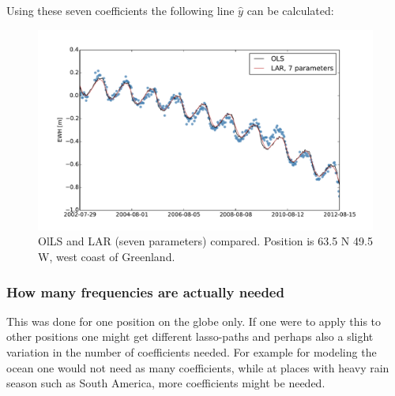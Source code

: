 Using these seven coefficients the following line $\hat{y}$ can be calculated:
\begin{figure}[H]
\center
\includegraphics[width=\textwidth]{figures/lar-compare}
\caption{OlLS and LAR (seven parameters) compared. Position is 63.5 N 49.5 W, west coast of Greenland.}
\end{figure}

\subsubsection{How many frequencies are actually needed}

This was done for one position on the globe only. If one were to apply this to other positions one might get different lasso-paths and perhaps also a slight variation in the number of coefficients needed. For example for modeling the ocean one would not need as many coefficients, while at places with heavy rain season such as South America, more coefficients might be needed.
